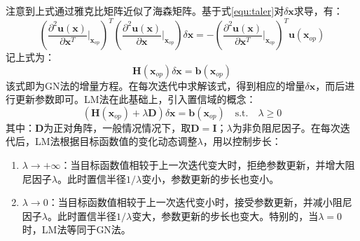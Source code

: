 注意到上式通过雅克比矩阵近似了海森矩阵。基于式\ref{equ:taler}对$\delta\boldsymbol{x}$求导，有：
\begin{equation}
  \left( \frac{\partial^2 \boldsymbol{u}(\boldsymbol{x})}{\partial \boldsymbol{x}^T}\bigg|_{\boldsymbol{x}_{op}}\right)^T
  \left( \frac{\partial^2 \boldsymbol{u}(\boldsymbol{x})}{\partial \boldsymbol{x}}\bigg|_{\boldsymbol{x}_{op}}\right)\delta\boldsymbol{x}=-\left( \frac{\partial^2 \boldsymbol{u}(\boldsymbol{x})}{\partial \boldsymbol{x}^T}\bigg|_{\boldsymbol{x}_{op}}\right)^T\boldsymbol{u}(\boldsymbol{x}_{op})
\end{equation}
记上式为：
\begin{equation}
  \boldsymbol{H}(\boldsymbol{x}_{op})\delta\boldsymbol{x}=\boldsymbol{b}(\boldsymbol{x}_{op})
\end{equation}
该式即为GN法的增量方程。在每次迭代中求解该式，得到相应的增量$\delta\boldsymbol{x}$，而后进行更新参数即可。LM法在此基础上，引入置信域的概念：
\begin{equation}
  \left( \boldsymbol{H}(\boldsymbol{x}_{op}) +\lambda\boldsymbol{D}\right) \delta\boldsymbol{x}=\boldsymbol{b}(\boldsymbol{x}_{op})\quad \mathrm{s.t.}\quad\lambda\ge0
\end{equation}
其中：$\boldsymbol{D}$为正对角阵，一般情况情况下，取$\boldsymbol{D}=\boldsymbol{I}$；$\lambda$为非负阻尼因子。在每次迭代后，LM法根据目标函数值的变化动态调整$\lambda$，用以控制步长：
\begin{enumerate}
  \item $\lambda\to+\infty$：当目标函数值相较于上一次迭代变大时，拒绝参数更新，并增大阻尼因子$\lambda$。此时置信半径$1/\lambda$变小，参数更新的步长也变小。

  \item $\lambda\to 0$：当目标函数值相较于上一次迭代变小时，接受参数更新，并减小阻尼因子$\lambda$。此时置信半径$1/\lambda$变大，参数更新的步长也变大。特别的，当$\lambda=0$时，LM法等同于GN法。
\end{enumerate}

